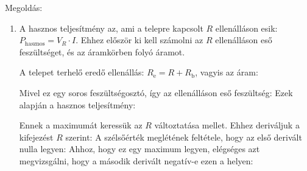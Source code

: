 
\ifdefined\megoldas
 
 Megoldás: 

 \begin{enumerate}[label=\alph*),itemsep=0pt]
  \item
   A hasznos teljesítmény az, ami a telepre kapcsolt $R$ ellenálláson esik: $P_\text{hasznos}=V_R\cdot I$. Ehhez először ki kell számolni az $R$ ellenálláson eső feszültséget, és az áramkörben folyó áramot. 

   A telepet terhelő eredő ellenállás: $R_\text{e}=R+R_\text{b}$, vagyis az áram:

   Mivel ez egy soros feszültségosztó, így az ellenálláson eső feszültség:
   Ezek alapján a hasznos teljesítmény:

   Ennek a maximumát keressük az $R$ változtatása mellet. Ehhez deriváljuk a kifejezést $R$ szerint:
   A szélsőérték meglétének feltétele, hogy az első derivált nulla legyen:
   Ahhoz, hogy ez egy maximum legyen, elégséges azt megvizsgálni, hogy a második derivált negatív-e ezen a helyen:


\end{enumerate}
